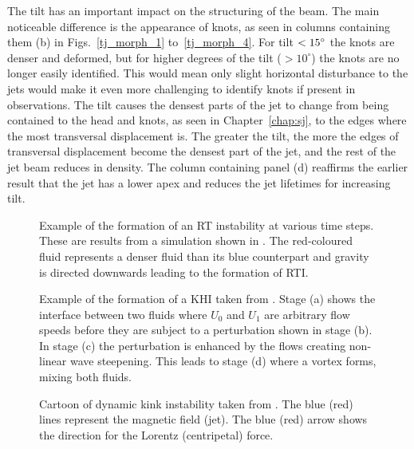 %
The tilt has an important impact on the structuring of the beam. The main noticeable difference is the appearance of knots, as seen in columns containing them (b) in Figs.~\ref{tj_morph_1} to~\ref{tj_morph_4}. For tilt $<15^{\circ}$ the knots are denser and deformed, but for higher degrees of the tilt ($> 10^{\circ}$) the knots are no longer easily identified. This would mean only slight horizontal disturbance to the jets would make it even more challenging to identify knots if present in observations. The tilt causes the densest parts of the jet to change from being contained to the head and knots, as seen in Chapter~\ref{chap:sj}, to the edges where the most transversal displacement is. The greater the tilt, the more the edges of transversal displacement become the densest part of the jet, and the rest of the jet beam reduces in density. The column containing panel (d) reaffirms the earlier result that the jet has a lower apex and reduces the jet lifetimes for increasing tilt.
%
\begin{figure}
\captionsetup[subfigure]{labelformat=empty}
\centering
{}
\caption{Example of the formation of an RT instability at various time steps. These are results from a simulation shown in \cite{Liang2019PhFl31k2104L}. The red-coloured fluid represents a denser fluid than its blue counterpart and gravity is directed downwards leading to the formation of RTI.}
\label{RT_example}
\end{figure}
\begin{figure}
\captionsetup[subfigure]{labelformat=empty}
\centering
{}
\caption{Example of the formation of a KHI taken from \cite{Barbulescu2018SoPh29386B}. Stage (a) shows the interface between two fluids where $U_0$ and $U_1$ are arbitrary flow speeds before they are subject to a perturbation shown in stage (b). In stage (c) the perturbation is enhanced by the flows creating non-linear wave steepening. This leads to stage (d) where a vortex forms, mixing both fluids.}
\label{KHI_example}
\end{figure}
\begin{figure}
\captionsetup[subfigure]{labelformat=empty}
\centering
{}
\caption{Cartoon of dynamic kink instability taken from \cite{Zaqarashvili2020ApJ893L46Z}. The blue (red) lines represent the magnetic field (jet). The blue (red) arrow shows the direction for the Lorentz (centripetal) force.}
\label{DKI_example}
\end{figure}
